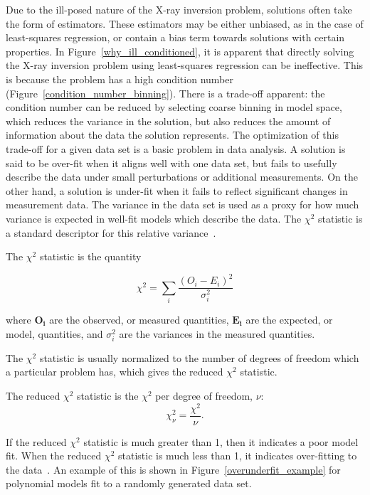 Due to the ill-posed nature of the X-ray inversion problem, solutions often take the form of estimators. These estimators may be either unbiased, as in the case of least-squares regression, or contain a bias term towards solutions with certain properties. In Figure~\ref{why_ill_conditioned}, it is apparent that directly solving the X-ray inversion problem using least-squares regression can be ineffective. This is because the problem has a high condition number (Figure~\ref{condition_number_binning}). There is a trade-off apparent: the condition number can be reduced by selecting coarse binning in model space, which reduces the variance in the solution, but also reduces the amount of information about the data the solution represents. The optimization of this trade-off for a given data set is a basic problem in data analysis. A solution is said to be over-fit when it aligns well with one data set, but fails to usefully describe the data under small perturbations or additional measurements. On the other hand, a solution is under-fit when it fails to reflect significant changes in measurement data. The variance in the data set is used as a proxy for how much variance is expected in well-fit models which describe the data. The $\chi^2$ statistic is a standard descriptor for this relative variance~\citep{Pearson1900}.

\begin{definition}
The $\chi^2$ statistic is the quantity 

$$\chi^2 = \sum_i \frac{(O_i - E_i)^2}{\sigma_i^2}$$

where $\mathbf{O_i}$ are the observed, or measured quantities, $\mathbf{E_i}$ are the expected, or model, quantities, and $\sigma_i^2$ are the variances in the measured quantities. 
\end{definition}

The $\chi^2$ statistic is usually normalized to the number of degrees of freedom which a particular problem has, which gives the reduced $\chi^2$ statistic.

\begin{definition}

The reduced $\chi^2$ statistic is the $\chi^2$ per degree of freedom, $\nu$: $$\chi^{2}_\nu = \frac{\chi^2}{\nu}.$$

\end{definition}

If the reduced $\chi^2$ statistic is much greater than 1, then it indicates a poor model fit. When the  reduced $\chi^2$ statistic is much less than 1, it indicates over-fitting to the data~\citep{Barlow2013}. An example of this is shown in Figure~\ref{overunderfit_example} for polynomial models fit to a randomly generated data set.

